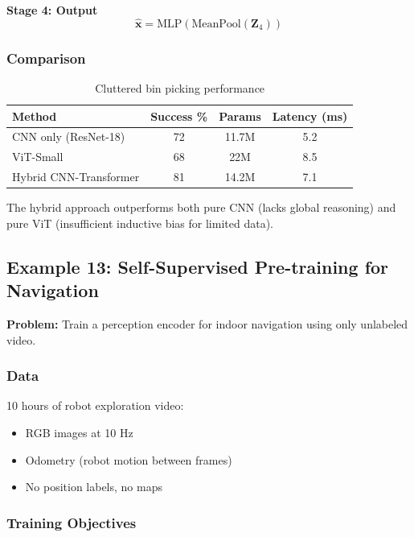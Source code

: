 \textbf{Stage 4: Output}
\begin{equation}
\hat{\mathbf{x}} = \text{MLP}(\text{MeanPool}(\mathbf{Z}_4))
\label{eq:hybrid_output}
\end{equation}

\subsubsection{Comparison}

\begin{table}[htbp]
\centering
\caption{Cluttered bin picking performance}
\label{tab:bin_picking}
\begin{tabular}{lccc}
\toprule
\textbf{Method} & \textbf{Success \%} & \textbf{Params} & \textbf{Latency (ms)} \\
\midrule
CNN only (ResNet-18) & 72 & 11.7M & 5.2 \\
ViT-Small & 68 & 22M & 8.5 \\
Hybrid CNN-Transformer & 81 & 14.2M & 7.1 \\
\bottomrule
\end{tabular}
\end{table}

The hybrid approach outperforms both pure CNN (lacks global reasoning) and pure ViT (insufficient inductive bias for limited data).


\subsection{Example 13: Self-Supervised Pre-training for Navigation}

\textbf{Problem:} Train a perception encoder for indoor navigation using only unlabeled video.

\subsubsection{Data}

10 hours of robot exploration video:
\begin{itemize}
    \item RGB images at 10 Hz
    \item Odometry (robot motion between frames)
    \item No position labels, no maps
\end{itemize}

\subsubsection{Training Objectives}

